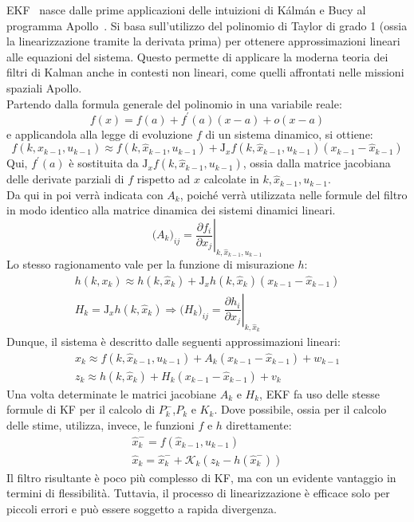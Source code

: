 \documentclass[12pt,a4paper,openright,twoside]{book}
\begin{document}
EKF~\cite{WelchB95} nasce dalle prime applicazioni delle intuizioni di Kálmán e Bucy al programma Apollo~\cite{smith1962}. Si basa sull'utilizzo del polinomio di Taylor di grado 1 (ossia la linearizzazione tramite la derivata prima) per ottenere approssimazioni lineari alle equazioni del sistema. Questo permette di applicare la moderna teoria dei filtri di Kalman anche in contesti non lineari, come quelli affrontati nelle missioni spaziali Apollo. \\
Partendo dalla formula generale del polinomio in una variabile reale:
\begin{equation*}
f(x)=f(a)+f^\prime(a)(x-a)+o(x-a)
\end{equation*}
e applicandola alla legge di evoluzione $f$ di un sistema dinamico, si ottiene:
\begin{equation*}
f(k,x_{k-1},u_{k-1})\approx f(k,\hat{x}_{k-1},u_{k-1})+\mathrm{J}_xf(k,\hat{x}_{k-1},u_{k-1})(x_{k-1}-\hat{x}_{k-1})
\end{equation*}
Qui, $f^\prime(a)$ è sostituita da $\mathrm{J}_xf(k,\hat{x}_{k-1},u_{k-1})$, ossia dalla matrice jacobiana delle derivate parziali di $f$ rispetto ad $x$ calcolate in $k,\hat{x}_{k-1},u_{k-1}$. \\
Da qui in poi verrà indicata con $A_k$, poiché verrà utilizzata nelle formule del filtro in modo identico alla matrice dinamica dei sistemi dinamici lineari.
\begin{equation*}
\bigl(A_k\bigr)_{ij}=\left.\dfrac{\partial f_i}{\partial x_j}\right\vert_{k,\hat{x}_{k-1},u_{k-1}}
\end{equation*}
Lo stesso ragionamento vale per la funzione di misurazione $h$:
\begin{gather*}
h(k,x_k)\approx h(k,\hat{x}_k)+\mathrm{J}_xh(k,\hat{x}_k)(x_{k-1}-\hat{x}_{k-1}) \\
H_k=\mathrm{J}_xh(k,\hat{x}_k)\Rightarrow\bigl(H_k\bigr)_{ij}=\left.\dfrac{\partial h_i}{\partial x_j}\right\vert_{k,\hat{x}_k}
\end{gather*}
Dunque, il sistema è descritto dalle seguenti approssimazioni lineari:
\begin{gather*}
x_k\approx f(k,\hat{x}_{k-1},u_{k-1})+A_k(x_{k-1}-\hat{x}_{k-1})+w_{k-1} \\
z_k\approx h(k,\hat{x}_k)+H_k(x_{k-1}-\hat{x}_{k-1})+v_k
\end{gather*}
Una volta determinate le matrici jacobiane $A_k$ e $H_k$, EKF fa uso delle stesse formule di KF per il calcolo di $P_k^-$,$P_k$ e $K_k$. Dove possibile, ossia per il calcolo delle stime, utilizza, invece, le funzioni $f$ e $h$ direttamente:
\begin{gather*}
\hat{x}_k^-=f(\hat{x}_{k-1},u_{k-1}) \\
\hat{x}_k=\hat{x}_k^-+\mathcal{K}_k(z_k-h(\hat{x}_k^-))
\end{gather*}
Il filtro risultante è poco più complesso di KF, ma con un evidente vantaggio in termini di flessibilità. Tuttavia, il processo di linearizzazione è efficace solo per piccoli errori e può essere soggetto a rapida divergenza. \\
\end{document}
